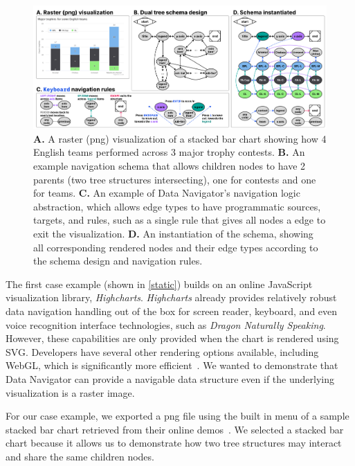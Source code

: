 \documentclass[journal]{vgtc}                %
\begin{document}
\begin{figure}[h]
  \centering
  \includegraphics[width=\textwidth]{figures/static.png}
  \caption{\textbf{A.} A raster (png) visualization of a stacked bar chart showing how 4 English teams performed across 3 major trophy contests. \textbf{B.} An example navigation schema that allows children nodes to have 2 parents (two tree structures intersecting), one for contests and one for teams. \textbf{C.} An example of Data Navigator's navigation logic abstraction, which allows edge types to have programmatic sources, targets, and rules, such as a single rule that gives all nodes a edge to exit the visualization. \textbf{D.} An instantiation of the schema, showing all corresponding rendered nodes and their edge types according to the schema design and navigation rules.}
  \label{static}
\end{figure}

The first case example (shown in \autoref{static}) builds on an online JavaScript visualization library, \textit{Highcharts}. \textit{Highcharts} already provides relatively robust data navigation handling out of the box for screen reader, keyboard, and even voice recognition interface technologies, such as \textit{Dragon Naturally Speaking}. However, these capabilities are only provided when the chart is rendered using SVG. Developers have several other rendering options available, including WebGL, which is significantly more efficient~\cite{HighsoftBoost}. We wanted to demonstrate that Data Navigator can provide a navigable data structure even if the underlying visualization is a raster image.

For our case example, we exported a png file using the built in menu of a sample stacked bar chart retrieved from their online demos~\cite{HighchartsStacked}. We selected a stacked bar chart because it allows us to demonstrate how two tree structures may interact and share the same children nodes.
\end{document}

